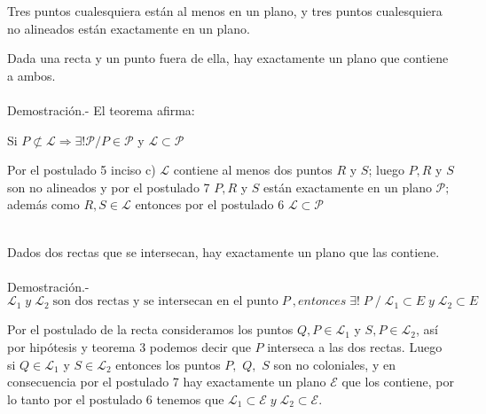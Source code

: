 \begin{tcolorbox}[colback=black!9!,colframe=white]
\begin{post} Tres puntos cualesquiera están al menos en un plano, y tres puntos cualesquiera no alineados están exactamente en un plano.
\end{post}
\end{tcolorbox}

\begin{teo}
Dada una recta y un punto fuera de ella, hay exactamente un plano que contiene a ambos.\\\\
Demostración.- \; El teorema afirma: 
\begin{center}
Si $P \not\subset \mathscr{L} \Rightarrow \exists ! \mathscr{P} / P \in \mathscr{P}$ y $\mathscr{L} \subset \mathscr{P}$\\
\begin{tikzpicture}

\end{tikzpicture}
\end{center}
Por el postulado 5 inciso c) $\mathscr{L}$ contiene al menos dos puntos $R$ y $S$; luego $P,R$ y $S$ son no alineados y por el postulado 7 $P,R$ y $S$ están exactamente en un plano $\mathscr{P};$ además como $R,S \in \mathscr{L}$ entonces por el postulado 6 $\mathscr{L} \subset \mathscr{P}$\\\\
\end{teo}

\begin{teo}
Dados dos rectas que se intersecan, hay exactamente un plano que las contiene.\\\\
Demostración.- \;  
$$ \mathscr{L}_1 \; y \; \mathscr{L}_2 \; \mbox{son dos rectas y se intersecan en el punto}\;  P \:, entonces \; \exists! \; P \; / \; \mathscr{L}_1 \subset E \; y \; \mathscr{L}_2 \subset E $$
\begin{center}
\end{center}
Por el postulado de la recta consideramos los puntos $Q,P \in \mathscr{L}_1 $ y $S,P \in \mathscr{L}_2$, así por hipótesis y teorema 3 podemos decir que $P$ interseca a las dos rectas. Luego si $Q \in \mathscr{L}_1$ y $S \in \mathscr{L}_2$ entonces  los puntos $P,$ $Q,$ $S$ son no coloniales, y en consecuencia por el postulado 7 hay exactamente un plano $\mathscr{E}$ que los contiene, por lo tanto por el postulado 6 tenemos que $\mathscr{L}_1 \subset \mathscr{E} \; y \; \mathscr{L}_2 \subset \mathscr{E}. $ 
\end{teo}

